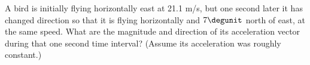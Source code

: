         A bird is initially flying horizontally east at 21.1
        m/s, but one second later it has changed direction so that
        it is flying horizontally and $7\degunit$ north of east, at the same
        speed. What are the magnitude and direction of its
        acceleration vector during that one second time interval?
        (Assume its acceleration was roughly constant.) \answercheck

